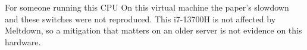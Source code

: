 \documentclass[aspectratio=169]{beamer}
\begin{document}
\begin{frame}{For someone running this CPU}
On this virtual machine the paper's slowdown and these switches were not reproduced. This i7-13700H is not affected by Meltdown, so a mitigation that matters on an older server is not evidence on this hardware.
\end{frame}
\end{document}
